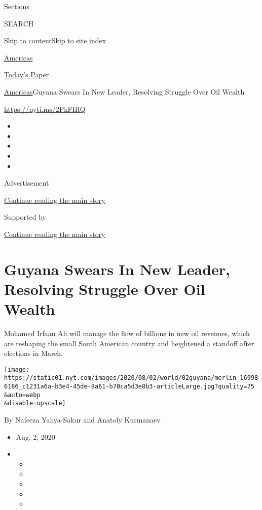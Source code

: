 Sections

SEARCH

\protect\hyperlink{site-content}{Skip to
content}\protect\hyperlink{site-index}{Skip to site index}

\href{https://www.nytimes.com/section/world/americas}{Americas}

\href{https://myaccount.nytimes.com/auth/login?response_type=cookie\&client_id=vi}{}

\href{https://www.nytimes.com/section/todayspaper}{Today's Paper}

\href{/section/world/americas}{Americas}\textbar{}Guyana Swears In New
Leader, Resolving Struggle Over Oil Wealth

\url{https://nyti.ms/2PkFIRQ}

\begin{itemize}
\item
\item
\item
\item
\item
\end{itemize}

Advertisement

\protect\hyperlink{after-top}{Continue reading the main story}

Supported by

\protect\hyperlink{after-sponsor}{Continue reading the main story}

\hypertarget{guyana-swears-in-new-leader-resolving-struggle-over-oil-wealth}{%
\section{Guyana Swears In New Leader, Resolving Struggle Over Oil
Wealth}\label{guyana-swears-in-new-leader-resolving-struggle-over-oil-wealth}}

Mohamed Irfaan Ali will manage the flow of billions in new oil revenues,
which are reshaping the small South American country and heightened a
standoff after elections in March.

\texttt{[image: https://static01.nyt.com/images/2020/08/02/world/02guyana/merlin\_169986186\_c1231a6a-b3e4-45de-8a61-b70ca5d3e8b3-articleLarge.jpg?quality=75\\\&auto=webp\\\&disable=upscale]}

By Nafeeza Yahya-Sakur and Anatoly Kurmanaev

\begin{itemize}
\item
  Aug. 2, 2020
\item
  \begin{itemize}
  \item
  \item
  \item
  \item
  \item
  \end{itemize}
\end{itemize}

